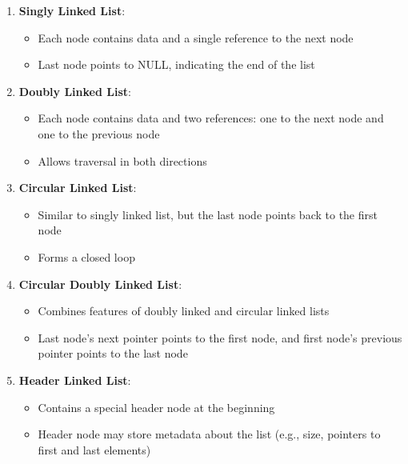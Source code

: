 \documentclass{article}
\providecommand{\tightlist}{%
\setlength{\itemsep}{0pt}\setlength{\parskip}{0pt}}
\begin{document}
\begin{enumerate}
\def\labelenumi{\arabic{enumi}.}
\tightlist
\item
  \textbf{Singly Linked List}:

  \begin{itemize}
  \tightlist
  \item
    Each node contains data and a single reference to the next node
  \item
    Last node points to NULL, indicating the end of the list
  \end{itemize}
\item
  \textbf{Doubly Linked List}:

  \begin{itemize}
  \tightlist
  \item
    Each node contains data and two references: one to the next node and
    one to the previous node
  \item
    Allows traversal in both directions
  \end{itemize}
\item
  \textbf{Circular Linked List}:

  \begin{itemize}
  \tightlist
  \item
    Similar to singly linked list, but the last node points back to the
    first node
  \item
    Forms a closed loop
  \end{itemize}
\item
  \textbf{Circular Doubly Linked List}:

  \begin{itemize}
  \tightlist
  \item
    Combines features of doubly linked and circular linked lists
  \item
    Last node's next pointer points to the first node, and first node's
    previous pointer points to the last node
  \end{itemize}
\item
  \textbf{Header Linked List}:

  \begin{itemize}
  \tightlist
  \item
    Contains a special header node at the beginning
  \item
    Header node may store metadata about the list (e.g., size, pointers
    to first and last elements)
  \end{itemize}
\end{enumerate}
\end{document}
